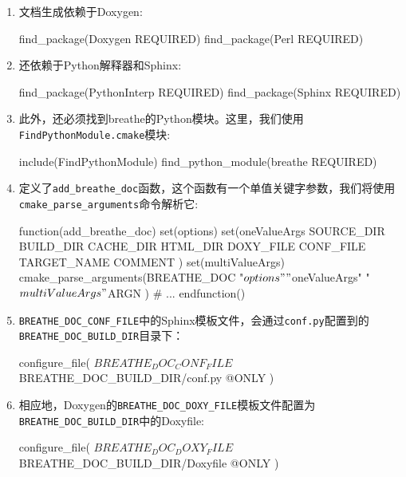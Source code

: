 \begin{enumerate}
\item 文档生成依赖于Doxygen:

\begin{codebox}[cmake]
find_package(Doxygen REQUIRED)
find_package(Perl REQUIRED)
\end{codebox}

\item 还依赖于Python解释器和Sphinx:

\begin{codebox}[cmake]
find_package(PythonInterp REQUIRED)
find_package(Sphinx REQUIRED)
\end{codebox}

\item 此外，还必须找到breathe的Python模块。这里，我们使用\texttt{FindPythonModule.cmake}模块:

\begin{codebox}[cmake]
include(FindPythonModule)
find_python_module(breathe REQUIRED)
\end{codebox}

\item 定义了\texttt{add\_breathe\_doc}函数，这个函数有一个单值关键字参数，我们将使用\texttt{cmake\_parse\_arguments}命令解析它:

\begin{codebox}[cmake]
function(add_breathe_doc)
  set(options)
  set(oneValueArgs
    SOURCE_DIR
    BUILD_DIR
    CACHE_DIR
    HTML_DIR
    DOXY_FILE
    CONF_FILE
    TARGET_NAME
    COMMENT
    )
  set(multiValueArgs)
  cmake_parse_arguments(BREATHE_DOC
    "${options}"
    "${oneValueArgs}"
    "${multiValueArgs}"
    ${ARGN}
    )
  # ...
endfunction()
\end{codebox}

\item \texttt{BREATHE\_DOC\_CONF\_FILE}中的Sphinx模板文件，会通过\texttt{conf.py}配置到的\texttt{BREATHE\_DOC\_BUILD\_DIR}目录下：

\begin{codebox}[cmake]
configure_file(
  ${BREATHE_DOC_CONF_FILE}
  ${BREATHE_DOC_BUILD_DIR}/conf.py
  @ONLY
  )
\end{codebox}

\item 相应地，Doxygen的\texttt{BREATHE\_DOC\_DOXY\_FILE}模板文件配置为\texttt{BREATHE\_DOC\_BUILD\_DIR}中的Doxyfile:

\begin{codebox}[cmake]
configure_file(
  ${BREATHE_DOC_DOXY_FILE}
  ${BREATHE_DOC_BUILD_DIR}/Doxyfile
  @ONLY
  )
\end{codebox}


\end{enumerate}
